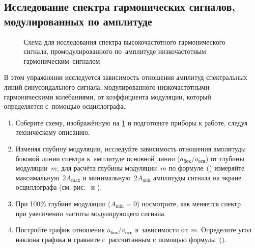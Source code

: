 \subsection*{Исследование спектра гармонических сигналов, модулированных по амплитуде}

%

\begin{figure}
	\label{fig:4}
	\caption{Схема для исследования спектра высокочастотного гармонического сигнала, промодулированного по~амплитуде низкочастотным гармоническим~сигналом}
\end{figure}

\begin{lab:task}
	В этом упражнении исследуется зависимость отношения амплитуд спектральных линий синусоидального сигнала, модулированного низкочастотными гармоническими колебаниями, от коэффициента модуляции, который определяется с~помощью осциллографа.
	\begin{enumerate}
		\item Соберите схему, изображённую на \ref{fig:4} и подготовьте приборы к работе, следуя техническому описанию.
		\item Изменяя глубину модуляции, исследуйте зависимость отношения амплитуды боковой линии спектра к~амплитуде основной линии ($a_{бок}/a_{осн}$) от глубины модуляции~$m$; для расчёта глубины модуляции~$m$ по формуле~() измеряйте максимальную~$2A_{\max}$ и минимальную~$2A_{\min}$ амплитуды сигнала на экране осциллографа (см. рис.~ и ).
		\item При 100\% глубине модуляции ($A_{\min}=0$) посмотрите, как меняется спектр при увеличении частоты модулирующего сигнала.
		\item Постройте график отношения $a_{бок}/a_{осн}$ в~зависимости от~$m$. Определите угол наклона графика и сравните с~рассчитанным с помощью формулы~().
	\end{enumerate}
\end{lab:task}

